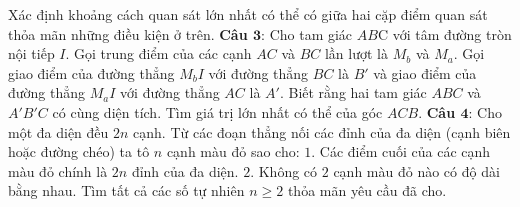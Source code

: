 \begin{multicols}{2}
	\vskip 0.1cm
	Xác định khoảng cách quan sát lớn nhất có thể có giữa hai cặp điểm quan sát thỏa mãn những điều kiện ở trên.
	\vskip 0.1cm
	\textbf{\color{cackithi}Câu $\pmb{3}$}: Cho tam giác $AB$C với tâm đường tròn nội tiếp $I$. Gọi trung điểm của các cạnh $AC$ và $BC$ lần lượt là $M_b$ và $M_a$. Gọi giao điểm của đường thẳng $M_bI$ với đường thẳng $BC$ là $B'$ và giao điểm của đường thẳng $M_aI$ với đường thẳng $AC$ là $A'$. Biết rằng hai tam giác $ABC$ và $A'B'C$ có cùng diện tích. 
	\vskip 0.1cm
	Tìm giá trị lớn nhất có thể của góc $ACB$.
	\vskip 0.1cm
	\textbf{\color{cackithi}Câu $\pmb{4}$}: Cho một đa diện đều $2n$ cạnh. Từ các đoạn thẳng nối các đỉnh của đa diện (cạnh biên hoặc đường chéo) ta tô $n$ cạnh màu đỏ sao cho:
	\vskip 0.1cm
	$1.$ Các điểm cuối của các cạnh màu đỏ chính là $2n$ đỉnh của đa diện.
	\vskip 0.1cm
	$2.$  Không có $2$ cạnh màu đỏ nào có độ dài bằng nhau.
	\vskip 0.1cm
	Tìm tất cả các số tự nhiên $n \ge 2$ thỏa mãn yêu cầu đã cho.
\end{multicols}
\newpage
\begingroup
{}
\centering
\endgroup
\vspace*{10pt}

